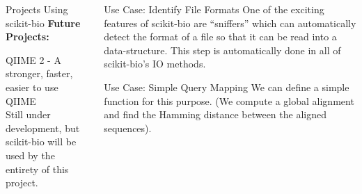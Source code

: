 \documentclass[final,t]{beamer}
\begin{document}
\begin{frame}{}
\begin{columns}[t]
\begin{column}{.3\linewidth}
\begin{block}{Projects Using scikit-bio}
            \textbf{Future Projects:} \\
            \begin{itemize}{\fontsize{28pt}{36pt}
              \item[$\bullet$] QIIME 2 - A stronger, faster, easier to use QIIME \hfill \\
              Still under development, but scikit-bio will be used by the entirety of this project.
              \newline}
          \end{itemize}
        \end{block}



    \end{column}
    \begin{column}{.3\linewidth}



        \begin{block}{Use Case: Identify File Formats}
            One of the exciting features of scikit-bio are ``sniffers'' which can automatically detect the format of a file so that it can be read into a data-structure. \newline\newline
             \vspace{1cm}
            This step is automatically done in all of scikit-bio's IO methods.
        \end{block}

        \begin{block}{Use Case: Simple Query Mapping}
          We can define a simple function for this purpose. (We compute a global alignment and find the Hamming distance between the aligned sequences).
          \newline\newline
          
        \end{block}


\end{column}
\end{columns}
\end{frame}
\end{document}
